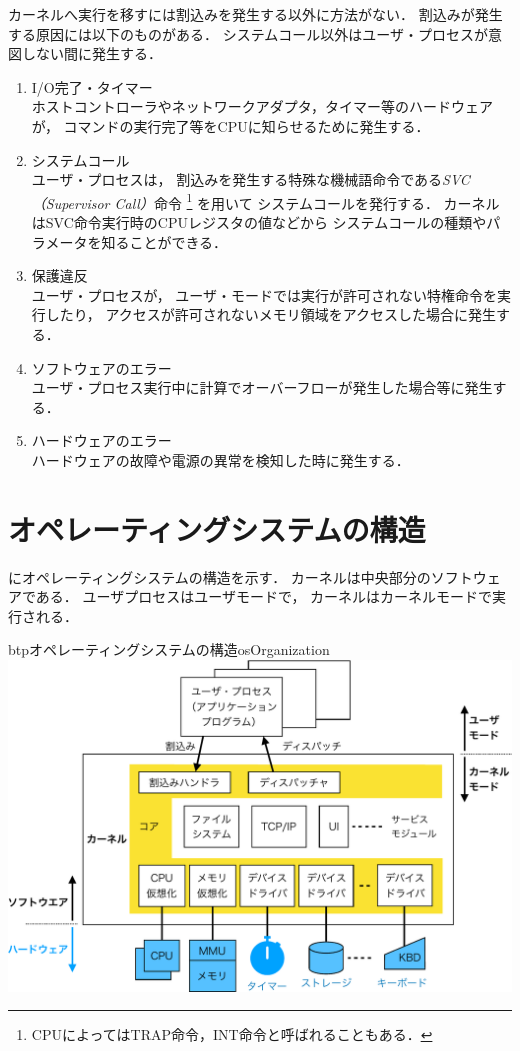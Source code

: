 カーネルへ実行を移すには割込みを発生する以外に方法がない．
割込みが発生する原因には以下のものがある．
システムコール以外はユーザ・プロセスが意図しない間に発生する．

\begin{enumerate}
\item I/O完了・タイマー \\
  ホストコントローラやネットワークアダプタ，タイマー等のハードウェアが，
  コマンドの実行完了等をCPUに知らせるために発生する．
\item システムコール \\
  ユーザ・プロセスは，
  割込みを発生する特殊な機械語命令である\emph{SVC（Supervisor Call）}命令
  \footnote{
    CPUによってはTRAP命令，INT命令と呼ばれることもある．
  }
  を用いて
  システムコールを発行する．
  カーネルはSVC命令実行時のCPUレジスタの値などから
  システムコールの種類やパラメータを知ることができる．
\item 保護違反 \\
  ユーザ・プロセスが，
  ユーザ・モードでは実行が許可されない特権命令を実行したり，
  アクセスが許可されないメモリ領域をアクセスした場合に発生する．
\item ソフトウェアのエラー \\
  ユーザ・プロセス実行中に計算でオーバーフローが発生した場合等に発生する．
\item ハードウェアのエラー \\
  ハードウェアの故障や電源の異常を検知した時に発生する．
\end{enumerate}

\section{オペレーティングシステムの構造}
にオペレーティングシステムの構造を示す．
カーネルは中央部分のソフトウェアである．
ユーザプロセスはユーザモードで，
カーネルはカーネルモードで実行される．

\begin{myfig}{btp}{オペレーティングシステムの構造}{osOrganization}
  \includegraphics[scale=0.66]{Fig/osOrganization-crop.pdf}
\end{myfig}

